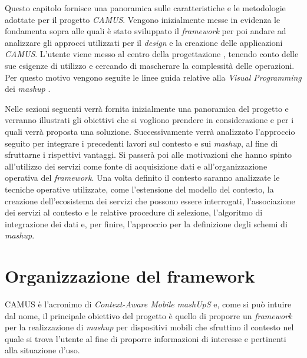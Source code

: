 Questo capitolo fornisce una panoramica sulle caratteristiche e le metodologie adottate per il progetto \emph{CAMUS}. Vengono inizialmente messe in evidenza le fondamenta sopra alle quali è stato sviluppato il \emph{framework} per poi andare ad analizzare gli approcci utilizzati per il \emph{design} e la creazione delle applicazioni \emph{CAMUS}. L'utente viene messo al centro della progettazione \cite{lieberman2006end}, tenendo conto delle sue esigenze di utilizzo e cercando di mascherare la complessità delle operazioni. Per questo motivo vengono seguite le linee guida relative alla \emph{Visual Programming} dei \emph{mashup} \cite{DBLP:journals/tweb/CappielloMP15}.

Nelle sezioni seguenti verrà fornita inizialmente una panoramica del progetto e verranno illustrati gli obiettivi che si vogliono prendere in considerazione e per i quali verrà proposta una soluzione. Successivamente verrà analizzato l'approccio seguito per integrare i precedenti lavori sul contesto e sui \emph{mashup}, al fine di sfruttarne i rispettivi vantaggi. Si passerà poi alle motivazioni che hanno spinto all'utilizzo dei servizi come fonte di acquisizione dati e all'organizzazione operativa del \emph{framework}. Una volta definito il contesto saranno analizzate le tecniche operative utilizzate, come l'estensione del modello del contesto, la creazione dell'ecosistema dei servizi che possono essere interrogati, l'associazione dei servizi al contesto e le relative procedure di selezione, l'algoritmo di integrazione dei dati e, per finire, l'approccio per la definizione degli schemi di \emph{mashup}.

\section{Organizzazione del framework\label{sec:panoramica-progetto}}

CAMUS è l'acronimo di \emph{Context-Aware Mobile mashUpS} e, come si può intuire dal nome, il principale obiettivo del progetto è quello di proporre un \emph{framework} per la realizzazione di \emph{mashup} per dispositivi mobili che sfruttino il contesto nel quale si trova l'utente al fine di proporre informazioni di interesse e pertinenti alla situazione d'uso.
 
